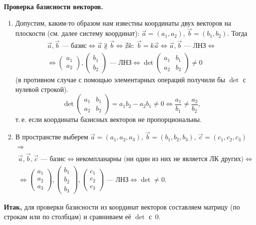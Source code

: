 \documentclass[a4paper,11pt]{article}
\newcommand{\lead}[1]{\textbf{\color{leadcol}#1}\ }
\begin{document}
\lead{Проверка базисности векторов.}
\begin{enumerate}[label=\arabic*)]
\item Допустим, каким-то образом нам известны координаты двух векторов на плоскости (см. далее
систему координат): $\vec a=(a_1,a_2)$, $\vec b=(b_1,b_2)$. Тогда
\begin{multline*}
\vec a,\vec b\text{~--- базис}\iff\vec a\nparallel\vec b\iff\nexists k:\ \vec b=k\vec a\iff\vec a,\vec b\text{~--- ЛНЗ}\iff{}\\
\iff\begin{pmatrix}a_1\\a_2\end{pmatrix},\begin{pmatrix}b_1\\b_2\end{pmatrix}\text{~--- ЛНЗ}\iff
\det\begin{pmatrix}a_1&b_1\\a_2&b_2\end{pmatrix}\ne0
\end{multline*}
(в противном случае с помощью элементарных операций получили бы $\det$ с нулевой строкой).
\[
\det\begin{pmatrix}a_1&b_1\\a_2&b_2\end{pmatrix}=a_1b_2-a_2b_1\ne0\iff\frac{a_1}{b_1}\ne\frac{a_2}{b_2},
\]
т.\,е. если координаты базисных векторов не пропорциональны.
\item В пространстве выберем $\vec a=(a_1,a_2,a_3)$, $\vec b=(b_1,b_2,b_3)$, $\vec c=(c_1,c_2,c_3)$ $\Rightarrow$
\begin{multline*}
\vec a,\vec b,\vec c\text{~--- базис}\iff\text{некомпланарны (ни один из них не является ЛК других)}\iff{}\\
\iff\begin{pmatrix}a_1\\a_2\\a_3\end{pmatrix},\begin{pmatrix}b_1\\b_2\\b_3\end{pmatrix},\begin{pmatrix}c_1\\c_2\\c_3\end{pmatrix}\text{~--- ЛНЗ}
\iff\det\ne0.
\end{multline*}
\end{enumerate}
\textbf{Итак,} для проверки базисности из координат векторов составляем матрицу (по строкам или
по столбцам) и сравниваем её $\det$ с~0.
\end{document}

